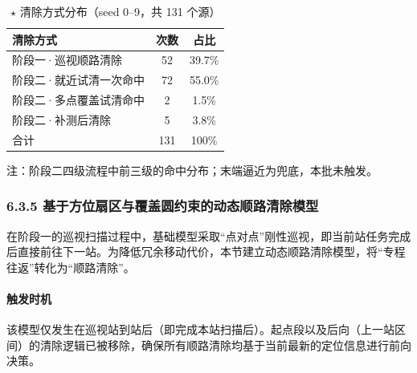 \documentclass[UTF8, zihao=5,AutoFakeBold=2]{ctexart}
\begin{document}
\begin{table}[H]
    \centering
    \caption{$\star$ 清除方式分布（seed 0--9，共 131 个源）}
    \label{tab:t3-methods}
    \begin{tabular}{lcc}
        \toprule
        清除方式 & 次数 & 占比 \\
        \midrule
        阶段一·巡视顺路清除 & 52 & 39.7\% \\
        阶段二·就近试清一次命中 & 72 & 55.0\% \\
        阶段二·多点覆盖试清命中 & 2 & 1.5\% \\
        阶段二·补测后清除 & 5 & 3.8\% \\
        \midrule
        合计 & 131 & 100\% \\
        \bottomrule
    \end{tabular}
    \par\smallskip
    \footnotesize{注：阶段二四级流程中前三级的命中分布；末端逼近为兜底，本批未触发。}
\end{table}

\subsubsection*{6.3.5 基于方位扇区与覆盖圆约束的动态顺路清除模型}

在阶段一的巡视扫描过程中，基础模型采取“点对点”刚性巡视，即当前站任务完成后直接前往下一站。为降低冗余移动代价，本节建立动态顺路清除模型，将“专程往返”转化为“顺路清除”。

\paragraph{触发时机}
该模型仅发生在巡视站到站后（即完成本站扫描后）。起点段以及后向（上一站区间）的清除逻辑已被移除，确保所有顺路清除均基于当前最新的定位信息进行前向决策。
\end{document}
